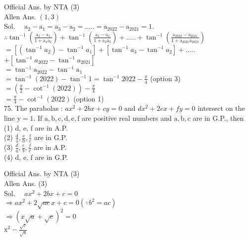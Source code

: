 \documentclass[10pt]{article}
\begin{document}
Official Ans. by NTA (3)\\
Allen Ans. \((1,3)\)\\
Sol. \(\quad \mathrm{a}_{2}-\mathrm{a}_{1}=\mathrm{a}_{3}-\mathrm{a}_{2}=\ldots . .=\mathrm{a}_{2022}-\mathrm{a}_{2021}=1\).\\
\(\therefore \tan ^{-1}\left(\frac{\mathrm{a}_{2}-\mathrm{a}_{1}}{1+\mathrm{a}_{1} \mathrm{a}_{2}}\right)+\tan ^{-1}\left(\frac{\mathrm{a}_{3}-\mathrm{a}_{2}}{1+\mathrm{a}_{2} \mathrm{a}_{3}}\right)+\ldots . .+\tan ^{-1}\left(\frac{\mathrm{a}_{2022}-\mathrm{a}_{2021}}{1+\mathrm{a}_{2021} \mathrm{a}_{2022}}\right)\)\\
\(=\left[\left(\tan ^{-1} a_{2}\right)-\tan ^{-1} a_{1}\right]+\left[\tan ^{-1} a_{3}-\tan ^{-1} a_{2}\right]+\ldots .\).\\
\(+\left[\tan ^{-1} a_{2022}-\tan ^{-1} a_{2021}\right]\)\\
\(=\tan ^{-1} \mathrm{a}_{2022}-\tan ^{-1} \mathrm{a}_{1}\)\\
\(=\tan ^{-1}(2022)-\tan ^{-1} 1=\tan ^{-1} 2022-\frac{\pi}{4}\) (option 3)\\
\(=\left(\frac{\pi}{2}-\cot ^{-1}(2022)\right)-\frac{\pi}{4}\)\\
\(=\frac{\pi}{4}-\cot ^{-1}(2022)\) (option 1)\\
75. The parabolas : \(a x^{2}+2 b x+c y=0\) and \(d x^{2}+2 e x+f y=0\) intersect on the line \(\mathrm{y}=1\). If \(\mathrm{a}, \mathrm{b}, \mathrm{c}, \mathrm{d}, \mathrm{e}, \mathrm{f}\) are positive real numbers and \(\mathrm{a}, \mathrm{b}, \mathrm{c}\) are in G.P., then\\
(1) d, e, f are in A.P.\\
(2) \(\frac{\mathrm{d}}{\mathrm{a}}, \frac{\mathrm{e}}{\mathrm{b}}, \frac{\mathrm{f}}{\mathrm{c}}\) are in G.P.\\
(3) \(\frac{d}{a}, \frac{e}{b}, \frac{f}{c}\) are in A.P.\\
(4) d, e, f are in G.P.

Official Ans. by NTA (3)\\
Allen Ans. (3)\\
Sol. \(\quad a x^{2}+2 b x+c=0\)\\
\(\Rightarrow a x^{2}+2 \sqrt{a c} x+c=0\left(\because b^{2}=a c\right)\)\\
\(\Rightarrow(x \sqrt{a}+\sqrt{c})^{2}=0\)\\
\(\mathrm{x}^{2}-\frac{\sqrt{\mathrm{c}}}{\sqrt{\mathrm{a}}}\)
\end{document}
